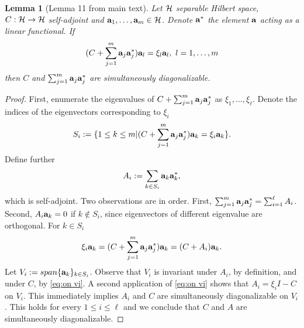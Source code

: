 \documentclass{article}
\newtheorem{lemma}{Lemma}
\begin{document}
\begin{lemma}[Lemma 11 from main text]%
  Let $\mathcal{H}$ separable Hilbert space, $C:\mathcal{H} \to \mathcal{H}$ self-adjoint
  and $\mathbf{a}_1,\dots,\mathbf{a}_m \in \mathcal{H}$. Denote $\mathbf{a}^*$ the element
  $\mathbf{a}$ acting as a linear functional. If
  \begin{equation*}
   (C + \sum_{j=1}^m \mathbf{a}_j\mathbf{a}_j^*) \mathbf{a}_l = \xi_l \mathbf{a}_l,\ l = 1,\dots,m
  \end{equation*}
  then $C$ and $\sum_{j=1}^m \mathbf{a}_j \mathbf{a}_j^*$ are simultaneously
  diagonalizable.
\end{lemma}
\begin{proof}
  First, enumerate the eigenvalues of $C + \sum_{j=1}^m
  \mathbf{a}_j\mathbf{a}_j^*$ as $\xi_1,\dots,\xi_\ell$. Denote the indices of
  the eigenvectors corresponding to $\xi_i$
  \begin{equation*}
    S_i := \{ 1 \leq k \leq m | (C + \sum_{j=1}^m \mathbf{a}_j\mathbf{a}_j^* )\mathbf{a}_k = \xi_i \mathbf{a}_k \}.
  \end{equation*}
  Define further
  \begin{equation*}
    A_i := \sum_{k \in S_i} \mathbf{a}_k \mathbf{a}_k^*,
  \end{equation*}
  which is self-adjoint. Two observations are in order. First,
  $\sum_{j=1}^m \mathbf{a}_j\mathbf{a}_j^* = \sum_{i=1}^\ell A_i$. Second, $A_i
  \mathbf{a}_k = 0$ if $k\not \in S_i$, since eigenvectors of different
  eigenvalue are orthogonal. For $k \in S_i$
  \begin{equation}\label{eq:on vi}
    \xi_i \mathbf{a}_k = (C + \sum_{j=1}^m \mathbf{a}_j \mathbf{a}_j^* ) \mathbf{a}_k = (C + A_i) \mathbf{a}_k.
  \end{equation}
  Let $V_i := span \{\mathbf{a}_k \}_{k\in S_i}$. Observe that $V_i$ is
  invariant under $A_i$, by definition, and under $C$, by \eqref{eq:on
    vi}. A second application of \eqref{eq:on vi} shows that $A_i =
  \xi_iI - C$ on $V_i$. This immediately implies $A_i$ and $C$ are
  simultaneously diagonalizable on $V_i$. This holds for every $1 \leq
  i \leq \ell$ and we conclude that $C$ and $A$ are simultaneously
  diagonalizable.
\end{proof}
\end{document}
